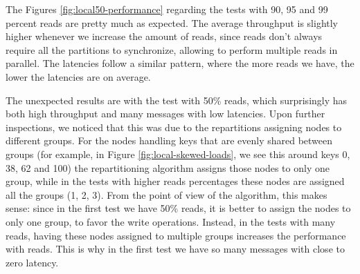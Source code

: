 


The Figures \ref{fig:local50-performance} regarding the tests with 90, 95 and 99 percent reads are pretty much as expected. The average throughput is slightly higher whenever we increase the amount of reads, since reads don't always require all the partitions to synchronize, allowing to perform multiple reads in parallel. The latencies follow a similar pattern, where the more reads we have, the lower the latencies are on average.

The unexpected results are with the test with 50\% reads, which surprisingly has both high throughput and many messages with low latencies. Upon further inspections, we noticed that this was due to the repartitions assigning nodes to different groups. For the nodes handling keys that are evenly shared between groups (for example, in Figure \ref{fig:local-skewed-loads}, we see this around keys 0, 38, 62 and 100) the repartitioning algorithm assigns those nodes to only one group, while in the tests with higher reads percentages these nodes are assigned all the groups (1, 2, 3). From the point of view of the algorithm, this makes sense: since in the first test we have 50\% reads, it is better to assign the nodes to only one group, to favor the write operations. Instead, in the tests with many reads, having these nodes assigned to multiple groups increases the performance with reads. This is why in the first test we have so many messages with close to zero latency.

